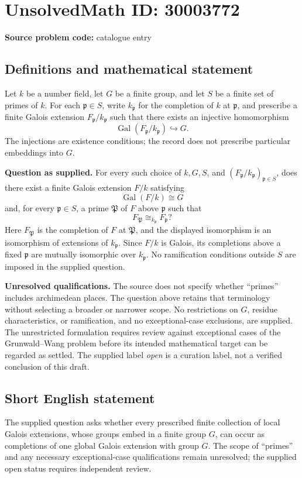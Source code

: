 \documentclass[11pt]{article}
\begin{document}
\section*{UnsolvedMath ID: 30003772}
\textbf{Source problem code:} catalogue entry
\subsection{Definitions and mathematical statement}
Let \(k\) be a number field, let \(G\) be a finite group, and let \(S\) be a finite set of primes of \(k\). For each \(\mathfrak p\in S\), write \(k_{\mathfrak p}\) for the completion of \(k\) at \(\mathfrak p\), and prescribe a finite Galois extension \(F_{\mathfrak p}/k_{\mathfrak p}\) such that there exists an injective homomorphism
\[
\operatorname{Gal}(F_{\mathfrak p}/k_{\mathfrak p})\hookrightarrow G.
\]
The injections are existence conditions; the record does not prescribe particular embeddings into \(G\).

\textbf{Question as supplied.} For every such choice of \(k,G,S\), and \((F_{\mathfrak p}/k_{\mathfrak p})_{\mathfrak p\in S}\), does there exist a finite Galois extension \(F/k\) satisfying
\[
\operatorname{Gal}(F/k)\cong G
\]
and, for every \(\mathfrak p\in S\), a prime \(\mathfrak P\) of \(F\) above \(\mathfrak p\) such that
\[
F_{\mathfrak P}\cong_{k_{\mathfrak p}} F_{\mathfrak p}?
\]
Here \(F_{\mathfrak P}\) is the completion of \(F\) at \(\mathfrak P\), and the displayed isomorphism is an isomorphism of extensions of \(k_{\mathfrak p}\). Since \(F/k\) is Galois, its completions above a fixed \(\mathfrak p\) are mutually isomorphic over \(k_{\mathfrak p}\). No ramification conditions outside \(S\) are imposed in the supplied question.

\textbf{Unresolved qualifications.} The source does not specify whether ``primes'' includes archimedean places. The question above retains that terminology without selecting a broader or narrower scope. No restrictions on \(G\), residue characteristics, or ramification, and no exceptional-case exclusions, are supplied. The unrestricted formulation requires review against exceptional cases of the Grunwald--Wang problem before its intended mathematical target can be regarded as settled. The supplied label \emph{open} is a curation label, not a verified conclusion of this draft.
\subsection{Short English statement}
The supplied question asks whether every prescribed finite collection of local Galois extensions, whose groups embed in a finite group \(G\), can occur as completions of one global Galois extension with group \(G\). The scope of ``primes'' and any necessary exceptional-case qualifications remain unresolved; the supplied open status requires independent review.
\end{document}
